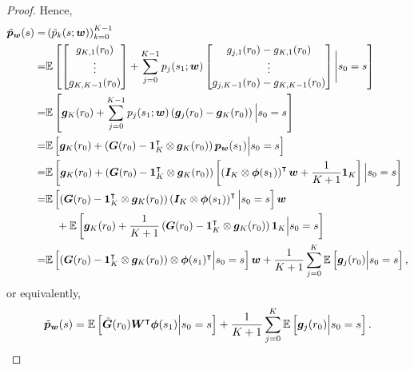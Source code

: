 \begin{proof}
Hence,
\begin{align*}
\tilde{{\bm{p}}}_{{\bm{w}}}(s)=& \left({\tilde{p}_k(s;{\bm{w}})}\right)_{k=0}^{K-1} \\
=&{\mathbb E}\left[{\begin{bmatrix}
g_{K,1}(r_0) \\
\vdots \\
g_{K,{K-1}}(r_0)
\end{bmatrix}+\sum_{j=0}^{K-1}p_j(s_1;
{\bm{w}})\begin{bmatrix}
g_{j,1}(r_0)-g_{K,1}(r_0) \\
\vdots \\
g_{j,K-1}(r_0)-g_{K,K-1}(r_0)
\end{bmatrix}\Bigg| s_0=s}\right]\\ 
=&{\mathbb E}\left[{{\bm{g}}_K(r_0)+\sum_{j=0}^{K-1}p_j(s_1;
{\bm{w}})\left({{\bm{g}}_j(r_0)-{\bm{g}}_K(r_0)}\right)    \Big| s_0=s }\right]\\
=&{\mathbb E}\left[{{\bm{g}}_K(r_0)+\left({{\bm{G}}(r_0)-\bm{1}_K^{\intercal}\otimes{\bm{g}}_K(r_0)}\right)  {\bm{p}}_{{\bm{w}}}(s_1)  \Big| s_0=s }\right]\\
=&{\mathbb E}\left[{{\bm{g}}_K(r_0)+\left({{\bm{G}}(r_0)-\bm{1}_K^{\intercal}\otimes{\bm{g}}_K(r_0)}\right)  \left[{\left({{\bm{I}}_K\otimes{\bm{\phi}}(s_1)}\right)^{\intercal}{\bm{w}}+\frac{1}{K+1}\bm{1}_{K}}\right]  \Big| s_0=s }\right]\\
=&{\mathbb E}\left[{\left({{\bm{G}}(r_0)-\bm{1}_K^{\intercal}\otimes{\bm{g}}_K(r_0)}\right)  \left({{\bm{I}}_K\otimes{\bm{\phi}}(s_1)}\right)^{\intercal} \Big| s_0=s }\right]{\bm{w}}\\
&\quad +{\mathbb E}\left[{{\bm{g}}_K(r_0)+\frac{1}{K+1}\left({{\bm{G}}(r_0)-\bm{1}_K^{\intercal}\otimes{\bm{g}}_K(r_0)}\right)  \bm{1}_{K} \Big| s_0=s }\right]\\
=&{\mathbb E}\left[{\left({{\bm{G}}(r_0)-\bm{1}_K^{\intercal}\otimes{\bm{g}}_K(r_0)}\right) \otimes {\bm{\phi}}(s_1)^{\intercal}\Big| s_0=s }\right]{\bm{w}}+\frac{1}{K+1}\sum_{j=0}^K{\mathbb E}\left[{{\bm{g}}_j(r_0) \Big| s_0=s }\right],
\end{align*}
or equivalently,
    \begin{equation*}
    \begin{aligned}
             \tilde{{\bm{p}}}_{{\bm{w}}}(s)={\mathbb E}\left[{\tilde{{\bm{G}}}(r_0) {\bm{W}}^{\intercal} {\bm{\phi}}(s_1)\Big| s_0=s }\right]+\frac{1}{K+1}\sum_{j=0}^K{\mathbb E}\left[{{\bm{g}}_j(r_0) \Big| s_0=s }\right].
    \end{aligned}
    \end{equation*}
\end{proof}

